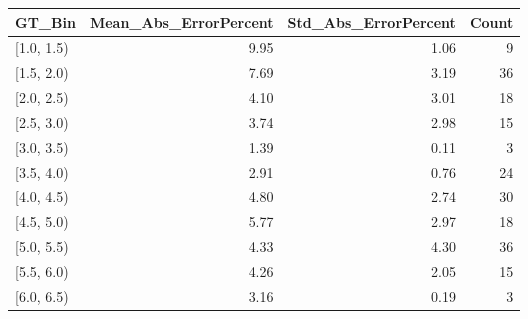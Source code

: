 \begin{tabular}{lrrr}
\toprule
GT_Bin & Mean_Abs_ErrorPercent & Std_Abs_ErrorPercent & Count \\
\midrule
[1.0, 1.5) & 9.95 & 1.06 & 9 \\
[1.5, 2.0) & 7.69 & 3.19 & 36 \\
[2.0, 2.5) & 4.10 & 3.01 & 18 \\
[2.5, 3.0) & 3.74 & 2.98 & 15 \\
[3.0, 3.5) & 1.39 & 0.11 & 3 \\
[3.5, 4.0) & 2.91 & 0.76 & 24 \\
[4.0, 4.5) & 4.80 & 2.74 & 30 \\
[4.5, 5.0) & 5.77 & 2.97 & 18 \\
[5.0, 5.5) & 4.33 & 4.30 & 36 \\
[5.5, 6.0) & 4.26 & 2.05 & 15 \\
[6.0, 6.5) & 3.16 & 0.19 & 3 \\
\bottomrule
\end{tabular}
